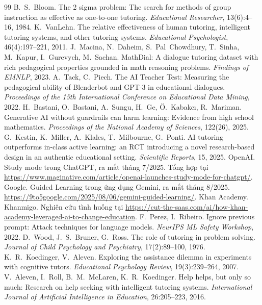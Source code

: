 \begin{thebibliography}{99}\footnotesize
\setlength{\itemsep}{1pt}\setlength{\parskip}{0pt}
 B.~S.~Bloom. The 2 sigma problem: The search for methods of group instruction as effective as one-to-one tutoring. \emph{Educational Researcher}, 13(6):4--16, 1984.
 K.~VanLehn. The relative effectiveness of human tutoring, intelligent tutoring systems, and other tutoring systems. \emph{Educational Psychologist}, 46(4):197--221, 2011.
 J.~Macina, N.~Daheim, S.~Pal~Chowdhury, T.~Sinha, M.~Kapur, I.~Gurevych, M.~Sachan. MathDial: A dialogue tutoring dataset with rich pedagogical properties grounded in math reasoning problems. \emph{Findings of EMNLP}, 2023.
 A.~Tack, C.~Piech. The AI Teacher Test: Measuring the pedagogical ability of Blenderbot and GPT-3 in educational dialogues. \emph{Proceedings of the 15th International Conference on Educational Data Mining}, 2022.
 H.~Bastani, O.~Bastani, A.~Sungu, H.~Ge, Ö.~Kabakcı, R.~Mariman. Generative AI without guardrails can harm learning: Evidence from high school mathematics. \emph{Proceedings of the National Academy of Sciences}, 122(26), 2025.
 G.~Kestin, K.~Miller, A.~Klales, T.~Milbourne, G.~Ponti. AI tutoring outperforms in-class active learning: an RCT introducing a novel research-based design in an authentic educational setting. \emph{Scientific Reports}, 15, 2025.
 OpenAI. Study mode trong ChatGPT, ra mắt tháng 7/2025. Tổng hợp tại \url{https://www.maginative.com/article/openai-launches-study-mode-for-chatgpt/}.
 Google. Guided Learning trong ứng dụng Gemini, ra mắt tháng 8/2025. \url{https://9to5google.com/2025/08/06/gemini-guided-learning/}.
 Khan Academy. Khanmigo. Nghiên cứu tình huống tại \url{https://cut-the-saas.com/ai/how-khan-academy-leveraged-ai-to-change-education}.
 F.~Perez, I.~Ribeiro. Ignore previous prompt: Attack techniques for language models. \emph{NeurIPS ML Safety Workshop}, 2022.
 D.~Wood, J.~S.~Bruner, G.~Ross. The role of tutoring in problem solving. \emph{Journal of Child Psychology and Psychiatry}, 17(2):89--100, 1976.
 K.~R.~Koedinger, V.~Aleven. Exploring the assistance dilemma in experiments with cognitive tutors. \emph{Educational Psychology Review}, 19(3):239--264, 2007.
 V.~Aleven, I.~Roll, B.~M.~McLaren, K.~R.~Koedinger. Help helps, but only so much: Research on help seeking with intelligent tutoring systems. \emph{International Journal of Artificial Intelligence in Education}, 26:205--223, 2016.

\end{thebibliography}

